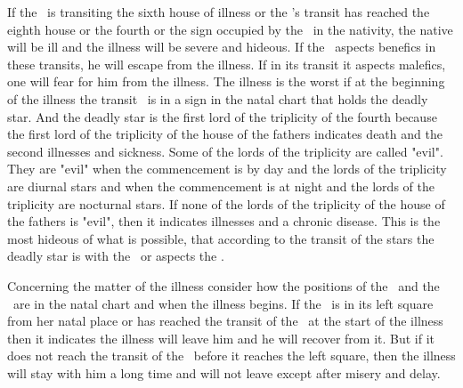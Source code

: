 If the \Moon\ is transiting the sixth house of illness or the \Moon's transit has reached the eighth house or the fourth or the sign occupied by the \Moon\ in the nativity, the native will be ill and the illness will be severe and hideous.  If the \Moon\ aspects benefics in these transits, he will escape from the illness. If in its transit it aspects malefics, one will fear for him from the illness. The illness is the worst if at the beginning of the illness the transit \Moon\ is in a sign in the natal chart that holds the deadly star. And the deadly star is the first lord of the triplicity of the fourth because the first lord of the triplicity of the house of the fathers indicates death and the second illnesses and sickness. Some of the lords of the triplicity are called "evil". They are "evil" when the commencement is by day and the lords of the triplicity are diurnal stars and when the commencement is at night and the lords of the triplicity are nocturnal stars. If none of the lords of the triplicity of the house of the fathers is "evil", then it indicates illnesses and a chronic disease. This is the most hideous of what is possible, that according to the transit of the stars the deadly star is with the \Moon\ or aspects the \Moon.

Concerning the matter of the illness consider how the positions of the \Sun\ and the \Moon\ are in the natal chart and when the illness begins. If the \Moon\ is in its left square from her natal place or has reached the transit of the \Sun\ at the start of the illness then it indicates the illness will leave him and he will recover from it. But if it does not reach the transit of the \Sun\ before it reaches the left square, then the illness will stay with him a long time and will not leave except after misery and delay.










